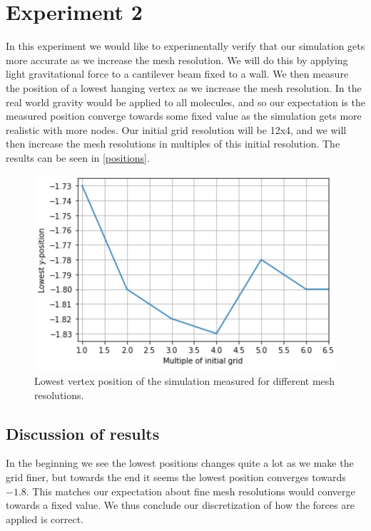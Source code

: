 \section{Experiment 2}
In this experiment we would like to experimentally verify that our simulation gets more accurate as we increase the mesh resolution. We will do this by applying light gravitational force to a cantilever beam fixed to a wall. We then measure the position of a lowest hanging vertex as we increase the mesh resolution. In the real world gravity would be applied to all molecules, and so our expectation is the measured position converge towards some fixed value as the simulation gets more realistic with more nodes. Our initial grid resolution will be 12x4, and we will then increase the mesh resolutions in multiples of this initial resolution. The results can be seen in \autoref{positions}.
\begin{figure}
	\centering
	\includegraphics[width=0.9\linewidth]{Materials/positions}
	\caption{Lowest vertex position of the simulation measured for different mesh resolutions.}
	\label{positions}
\end{figure}

\subsection{Discussion of results}
In the beginning we see the lowest positions changes quite a lot as we make the grid finer, but towards the end it seems the lowest position converges towards $-1.8$. This matches our expectation about fine mesh resolutions would converge towards a fixed value. We thus conclude our discretization of how the forces are applied is correct.